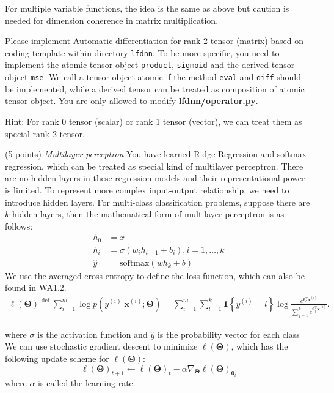 \documentclass[a4paper, 12pt]{exam}
\newcommand{\bTheta}{\bm{\Theta}}
\newcommand*{\defeq}{\stackrel{\text{def}}{=}}
\begin{document}
\begin{questions}
		For multiple variable functions, the idea is the same as above but caution is needed for dimension coherence in matrix multiplication.
		
		Please implement Automatic differentiation for rank 2 tensor (matrix) based on coding template within directory \texttt{lfdnn}. To be more specific, you need to implement
		the atomic tensor object \texttt{product}, \texttt{sigmoid} and the derived tensor object \texttt{mse}. We call a tensor object
		atomic if the method \texttt{eval} and \texttt{diff} should be implemented, while a derived tensor can be treated as composition of
		atomic tensor object. You are only allowed to modify \textbf{lfdnn/operator.py}.
		
		Hint: For rank 0 tensor (scalar) or rank 1 tensor (vector), we can treat
		them as special rank 2 tensor.
		
		\question (5 points) \emph{Multilayer perceptron} You have learned Ridge Regression and softmax regression, which can be treated
		as special kind of multilayer perceptron. There are no hidden layers in these regression models and their representational power is limited.
		To represent more complex input-output relationship, we need to introduce hidden layers. For multi-class classification problems, suppose there are $k$ hidden layers,
		then the mathematical form of multilayer perceptron is as follows:
		\begin{align*}
		h_0 &= x \\
		h_i &= \sigma(w_i h_{i-1} + b_i), i = 1, \dots, k \\
		\hat{y} &= \textrm{softmax}(w h_k + b)
		\end{align*}
		We use the averaged cross entropy to define the loss function, which can also be found in WA1.2.
		\begin{align*}
		\ell(\bTheta)
		\defeq \sum_{i=1}^{m} \log p(y^{(i)}|\bm{x}^{(i)};\bTheta) = \sum_{i=1}^{m}\sum_{l=1}^{k} \bm{1}\left\{ y^{(i)} = l\right\} \log \frac{e^{\bm{\theta}_l^{\mathrm{T}}\bm{x}^{(i)}}}{\sum_{j=1}^k e^{\bm{\theta}_j^{\mathrm{T}}\bm{x}^{(i)}}}.
		\end{align*}
		
		where $\sigma$ is the activation function and $\hat{y}$ is the probability vector for each class
		We can use stochastic gradient descent to minimize $\ell(\bTheta)$, which has the following update scheme for $\ell(\bTheta)$:
		\begin{equation*}
		\ell(\bTheta)_{t+1} \leftarrow \ell(\bTheta)_t - \alpha \nabla_{\bm{\Theta}} \ell(\bTheta)_{\bm{\theta}_t}
		\end{equation*}
		where $\alpha$ is called the learning rate.
		

\end{questions}
\end{document}
